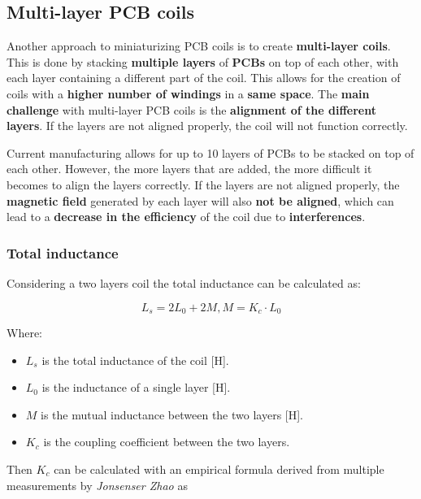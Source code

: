 \subsection{Multi-layer PCB coils}
Another approach to miniaturizing PCB coils is to create \textbf{multi-layer coils}. 
This is done by stacking \textbf{multiple layers} of \textbf{PCBs} on top of each other, with each layer containing a different part of the coil. This allows for the creation of coils with a \textbf{higher number of windings} in a \textbf{same space}. The \textbf{main challenge} with multi-layer PCB coils is the \textbf{alignment of the different layers}. If the layers are not aligned properly, the coil will not function correctly.

Current manufacturing allows for up to 10 layers of PCBs to be stacked on top of each other. However, the more layers that are added, the more difficult it becomes to align the layers correctly.
If the layers are not aligned properly, the \textbf{magnetic field} generated by each layer will also \textbf{not be aligned}, which can lead to a \textbf{decrease in the efficiency} of the coil due to \textbf{interferences}.


\subsubsection{Total inductance}
\begin{samepage}
    Considering a two layers coil the total inductance can be calculated as:
    \nopagebreak

    \begin{equation}
        L_s = 2L_0 + 2M,   M = K_c \cdot L_0
    \end{equation}
    \nopagebreak

    Where:
    \begin{itemize}
        \item \( L_s \) is the total inductance of the coil [H].
        \item \( L_0 \) is the inductance of a single layer [H].
        \item \( M \) is the mutual inductance between the two layers [H].
        \item \( K_c \) is the coupling coefficient between the two layers.
    \end{itemize}
\end{samepage}

    Then $K_c$ can be calculated with an empirical formula derived from multiple measurements by \textit{Jonsenser Zhao} \cite{Multilayer_spiral_inductors} as

